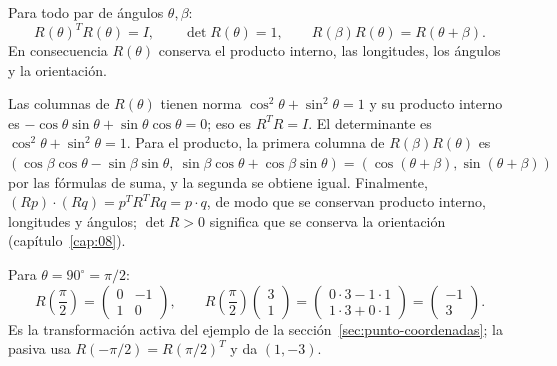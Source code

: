 \begin{center}
\end{center}

\begin{proposicion}\label{prop:propiedades-R}
Para todo par de ángulos \(\theta,\beta\):
\[
R(\theta)^TR(\theta)=I,\qquad
\det R(\theta)=1,\qquad
R(\beta)R(\theta)=R(\theta+\beta).
\]
En consecuencia \(R(\theta)\) conserva el producto interno, las longitudes, los ángulos y la
orientación.
\end{proposicion}

\begin{demostracion}
Las columnas de \(R(\theta)\) tienen norma \(\cos^2\theta+\sin^2\theta=1\) y su producto
interno es \(-\cos\theta\sin\theta+\sin\theta\cos\theta=0\); eso es \(R^TR=I\). El
determinante es \(\cos^2\theta+\sin^2\theta=1\). Para el producto, la primera columna de
\(R(\beta)R(\theta)\) es
\((\cos\beta\cos\theta-\sin\beta\sin\theta,\ \sin\beta\cos\theta+\cos\beta\sin\theta)
=(\cos(\theta+\beta),\sin(\theta+\beta))\) por las fórmulas de suma, y la segunda se obtiene
igual. Finalmente, \((Rp)\cdot(Rq)=p^TR^TRq=p\cdot q\), de modo que se conservan producto
interno, longitudes y ángulos; \(\det R>0\) significa que se conserva la orientación
(capítulo~\ref{cap:08}).
\end{demostracion}

\begin{ejemplo}
Para \(\theta=90^\circ=\pi/2\):
\[
R\left(\frac{\pi}{2}\right)=
\begin{pmatrix}0&-1\\1&0\end{pmatrix},
\qquad
R\left(\frac{\pi}{2}\right)\begin{pmatrix}3\\1\end{pmatrix}
=\begin{pmatrix}0\cdot3-1\cdot1\\1\cdot3+0\cdot1\end{pmatrix}
=\begin{pmatrix}-1\\3\end{pmatrix}.
\]
Es la transformación activa del ejemplo de la sección~\ref{sec:punto-coordenadas}; la pasiva
usa \(R(-\pi/2)=R(\pi/2)^T\) y da \((1,-3)\).
\end{ejemplo}


